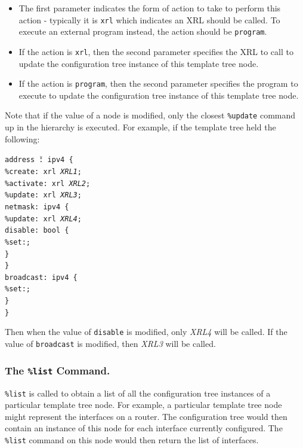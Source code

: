 \documentclass[11pt]{article}
\begin{document}
\begin{itemize}

  \item The first parameter indicates the form of action to take to perform
   this action - typically it is {\tt xrl} which indicates an XRL should
   be called.
   To execute an external program instead, the action should be {\tt program}.

  \item If the action is {\tt xrl}, then the second parameter specifies the
   XRL to call to update the configuration tree instance of this template tree
   node.

  \item If the action is {\tt program}, then the second parameter specifies
   the program to execute to update the configuration tree instance of this
   template tree node.

\end{itemize}

Note that if the value of a node is modified, only the closest {\tt \%update}
command up in the hierarchy is executed. For example, if the template tree
held the following:

\begin{tabbing}
\tt addr\=\tt ess \=\tt@: i\=\tt pv4 \{\\
    \>\tt\%create: xrl {\it XRL1};\\
    \>\tt\%activate: xrl {\it XRL2};\\
    \>\tt\%update: xrl {\it XRL3};\\
    \>\tt netmask: ipv4 \{\\
        \>\>\tt\%update: xrl {\it XRL4};\\
        \>\>\tt disable: bool \{\\
             \>\>\>\tt\%set:;\\
        \>\>\tt\}\\
    \>\tt\}\\
    \>\tt broadcast: ipv4 \{\\
        \>\>\tt\%set:;\\
    \>\tt\}\\
\tt\}
\end{tabbing}

Then when the value of {\tt disable} is modified, only
{\it XRL4} will be called. If the value of {\tt broadcast} is modified,
then {\it XRL3} will be called.

\subsubsection{The {\tt \%list} Command.}
{\tt \%list} is called to obtain a list of all the configuration tree
instances of a particular template tree node.  For example, a
particular template tree node might represent the interfaces on a
router.  The configuration tree would then contain an instance of this
node for each interface currently configured.  The {\tt \%list}
command on this node would then return the list of interfaces.
\end{document}
